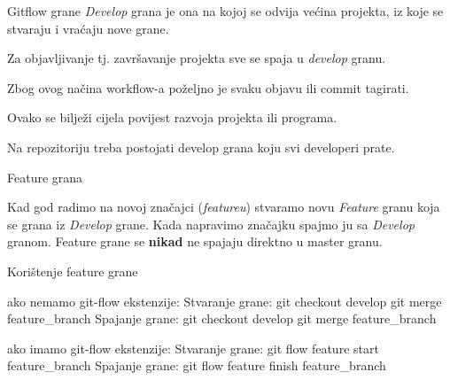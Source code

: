 \documentclass[10pt]{beamer}
\begin{document}
\begin{frame}{Gitflow grane}
\textit{Develop} grana je ona na kojoj se odvija većina projekta, iz koje se stvaraju i vraćaju nove grane.

Za objavljivanje tj. završavanje projekta sve se spaja u \textit{develop} granu.

Zbog ovog načina workflow-a poželjno je svaku objavu ili commit tagirati.

Ovako se bilježi cijela povijest razvoja projekta ili programa.

Na repozitoriju treba postojati develop grana koju svi developeri prate.

\end{frame}

\begin{frame}{Feature grana}

Kad god radimo na novoj značajci (\textit{featureu}) stvaramo novu \textit{Feature} granu koja se grana iz \textit{Develop} grane. Kada napravimo značajku spajmo ju sa \textit{Develop} granom.
Feature grane se \textbf{nikad} ne spajaju direktno u master granu.

{
\setlength{\fboxsep}{1pt}
\setlength{\fboxrule}{1pt}
}

\end{frame}

\begin{frame}{Korištenje feature grane}

ako nemamo git-flow ekstenzije:
Stvaranje grane:
git checkout develop
git merge feature_branch
Spajanje grane:
git checkout develop
git merge feature_branch

ako imamo git-flow ekstenzije:
Stvaranje grane:
git flow feature start feature_branch
Spajanje grane:
git flow feature finish feature_branch

\end{frame}
\end{document}
